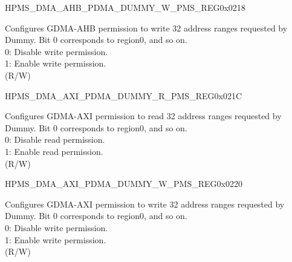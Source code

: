 \begin{register}{H}{PMS\_DMA\_AHB\_PDMA\_DUMMY\_W\_PMS\_REG}{0x0218}\label{regdesc:PMSDMAAHBPDMADUMMYWPMSREG}
%
\regnewline%
\begin{regdesc}\begin{reglist}
\label{fielddesc:PMSDMAAHBPDMADUMMYWPMS}\item [PMS\_DMA\_AHB\_PDMA\_DUMMY\_W\_PMS] Configures GDMA-AHB permission to write 32 address ranges requested by Dummy. Bit 0 corresponds to region0, and so on.\\
0: Disable write permission.\\
1: Enable write permission.\\ (R/W)
\end{reglist}\end{regdesc}
\end{register}


\begin{register}{H}{PMS\_DMA\_AXI\_PDMA\_DUMMY\_R\_PMS\_REG}{0x021C}\label{regdesc:PMSDMAAXIPDMADUMMYRPMSREG}
%
\regnewline%
\begin{regdesc}\begin{reglist}
\label{fielddesc:PMSDMAAXIPDMADUMMYRPMS}\item [PMS\_DMA\_AXI\_PDMA\_DUMMY\_R\_PMS] Configures GDMA-AXI permission to read 32 address ranges requested by Dummy. Bit 0 corresponds to region0, and so on.\\
0: Disable read permission.\\
1: Enable read permission.\\ (R/W)
\end{reglist}\end{regdesc}
\end{register}


\begin{register}{H}{PMS\_DMA\_AXI\_PDMA\_DUMMY\_W\_PMS\_REG}{0x0220}\label{regdesc:PMSDMAAXIPDMADUMMYWPMSREG}
%
\regnewline%
\begin{regdesc}\begin{reglist}
\label{fielddesc:PMSDMAAXIPDMADUMMYWPMS}\item [PMS\_DMA\_AXI\_PDMA\_DUMMY\_W\_PMS] Configures GDMA-AXI permission to write 32 address ranges requested by Dummy. Bit 0 corresponds to region0, and so on.\\
0: Disable write permission.\\
1: Enable write permission.\\ (R/W)
\end{reglist}\end{regdesc}
\end{register}


